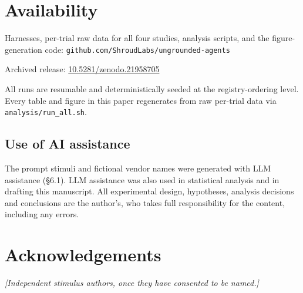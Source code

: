 \documentclass[
  11pt]{article}
\begin{document}
\hypertarget{availability}{%
\section{Availability}\label{availability}}

Harnesses, per-trial raw data for all four studies, analysis scripts,
and the figure-generation code:
\texttt{github.com/ShroudLabs/ungrounded-agents}

Archived release:
\href{https://doi.org/10.5281/zenodo.21958705}{10.5281/zenodo.21958705}

All runs are resumable and deterministically seeded at the
registry-ordering level. Every table and figure in this paper
regenerates from raw per-trial data via \texttt{analysis/run\_all.sh}.

\hypertarget{use-of-ai-assistance}{%
\subsection{Use of AI assistance}\label{use-of-ai-assistance}}

The prompt stimuli and fictional vendor names were generated with LLM
assistance (\S6.1). LLM assistance was also used in statistical analysis
and in drafting this manuscript. All experimental design, hypotheses,
analysis decisions and conclusions are the author's, who takes full
responsibility for the content, including any errors.

\hypertarget{acknowledgements}{%
\section{Acknowledgements}\label{acknowledgements}}

\emph{{[}Independent stimulus authors, once they have consented to be
named.{]}}

  
\end{document}
